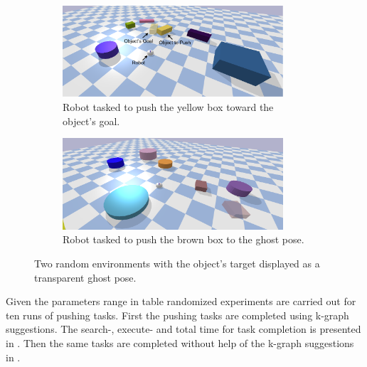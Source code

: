 \begin{figure}[H]
    \centering
    \begin{subfigure}{\textwidth}
    \centering
    \includegraphics[width=0.9\textwidth]{figures/results/random_1.drawio}
    \caption{Robot tasked to push the yellow box toward the object's goal.}
    \end{subfigure}

    \vspace{0.2cm}
    \begin{subfigure}{\textwidth}
    \centering
    \includegraphics[width=0.9\textwidth]{figures/results/random_2}
    \caption{Robot tasked to push the brown box to the ghost pose.}
    \end{subfigure}
    \caption{Two random environments with the object's target displayed as a transparent ghost pose.}%
    \label{fig:random_environnment}
\end{figure}

Given the parameters range in table  randomized experiments are carried out for ten runs of pushing tasks. First the pushing tasks are completed using \ac{k-graph} suggestions. The search-, execute- and total time for task completion is presented in . Then the same tasks are completed without help of the \ac{k-graph} suggestions in . 

